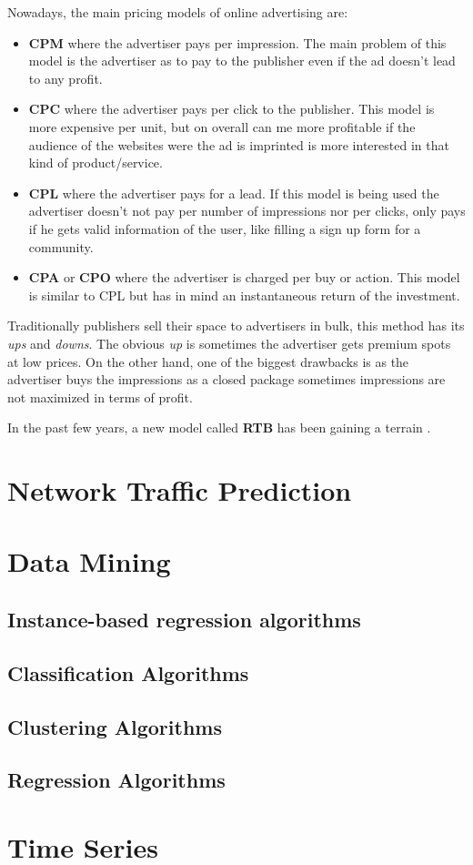 Nowadays, the main pricing models of online advertising are:
\begin{itemize}
\item\textbf{CPM} where the advertiser pays per impression. The main problem of this model is the advertiser as to pay to the publisher even
if the ad doesn't lead to any profit.
\item\textbf{CPC} where the advertiser pays per click to the publisher. This model is more expensive per unit\cite{Performics}, but on overall can me more
profitable\cite{Performics} if the audience of the websites were the ad is imprinted is more interested in that kind of product/service\cite{Andrea2004}.
\item\textbf{CPL} where the advertiser pays for a lead. If this model is being used the advertiser doesn't not pay per number of impressions nor per clicks,
only pays if he gets valid information of the user, like filling a sign up form for a community.
\item\textbf{CPA} or \textbf{CPO} where the advertiser is charged per buy or action. This model is similar to CPL but has in mind an instantaneous return of
the investment.
\end{itemize}

Traditionally publishers sell their space to advertisers in bulk, this method has its \textit{ups} and \textit{downs}. The obvious \textit{up} is sometimes the
advertiser gets premium spots at low prices. On the other hand, one of the biggest drawbacks is as the advertiser buys the impressions as a
closed package sometimes impressions are not maximized in terms of profit.

In the past few years, a new model called \textbf{RTB} has been gaining a terrain \cite{Adfonic}. 

\section{Network Traffic Prediction}\label{sec:network}

\section{Data Mining}\label{sec:datamining}

\subsection{Instance-based regression algorithms}\label{sec:instance}

\subsection{Classification Algorithms}\label{sec:classification}

\subsection{Clustering Algorithms}\label{sec:clust}

\subsection{Regression Algorithms}\label{sec:regr}

\section{Time Series}\label{sec:timeseries}
